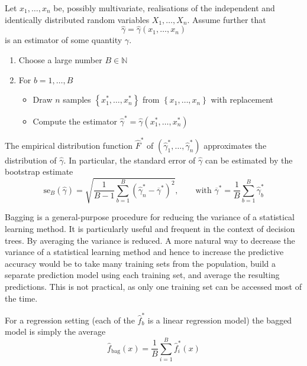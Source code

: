 \documentclass[11pt]{article}
\newcommand*\samplemean[1]{\overline{#1}}
\begin{document}
\newpage
\begin{definition}
	Let $x_1,\dots, x_n$ be, possibly multivariate, realisations of the independent and identically distributed random variables $X_1, \dots, X_n$. Assume further that
	\begin{equation*}
		\hat{\gamma} = \hat{\gamma}(x_1, \dots, x_n)
	\end{equation*}
	is an estimator of some quantity $\gamma$.
	\begin{enumerate}
		\item Choose a large number $B\in \mathbb{N}$
		\item For $b = 1,\dots,B$
		\begin{itemize}
			\item Draw $n$ samples $\left\{ x_1^{*}, \dots, x_n^{*} \right\}$ from $\left\{ x_1, \dots, x_n \right\}$ with replacement
			\item Compute the estimator $\hat{\gamma}^{*} = \hat{\gamma}(x_1^{*}, \dots, x_n^{*})$
		\end{itemize}
	\end{enumerate}
	\item The empirical distribution function $\hat{F}^*$ of $ \left( \hat{\gamma}_1^{*},\dots,\hat{\gamma}_n^{*} \right)$ approximates the distribution of $\hat{\gamma}$. In particular, the standard error of $\hat{\gamma}$ can be estimated by the bootstrap estimate
	\begin{equation*}
		\text{se}_B(\hat{\gamma}) = \sqrt{\frac{1}{B-1}\sum_{b=1}^{B}(\hat{\gamma}_n^{*} - \samplemean{\gamma}^{*})^2},\qquad\text{with } \samplemean{\gamma}^{*} = \frac{1}{B}\sum_{b=1}^{B}\hat{\gamma}_b^*
	\end{equation*}
\end{definition}

Bagging is a general-purpose procedure for reducing the variance of a statistical learning method. It is particularly useful and frequent in the context of decision trees. By averaging the variance is reduced. A more natural way to decrease the variance of a statistical learning method and hence to increase the predictive accuracy would be to take many training sets from the population, build a separate prediction model using each training set, and average the resulting predictions. This is not practical, as only one training set can be accessed most of the time.

For a regression setting (each of the $\hat{f}_b^*$ is a linear regression model) the bagged model is simply the average
\begin{equation*}
	\hat{f}_{\text{bag}}(x) = \frac{1}{B} \sum_{i=1}^{B} \hat{f}_i^*(x)
\end{equation*}
\end{document}
